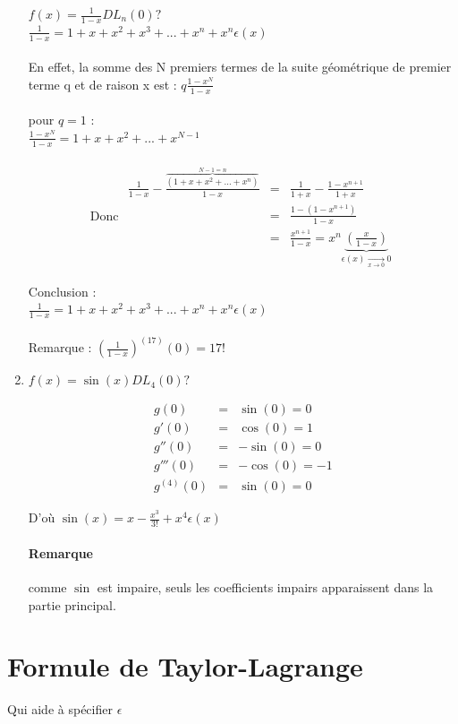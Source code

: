 \begin{enumerate}
	$f(x) = \frac{1}{1-x} DL_n(0) ?$ ~\\
	$\frac{1}{1-x} = 1+x+x^2+x^3 + ... + x^n + x^n\epsilon(x)$ ~\\ ~\\
	En effet, la somme des N premiers termes de la suite géométrique de premier terme q et de raison x est : $q\frac{1-x^N}{1-x}$ ~\\ ~\\
	pour $q=1$ : ~\\
	$\frac{1-x^N}{1-x} = 1+x+x^2+...+x^{N-1}$ ~\\ ~\\
	\[\text{Donc } \begin{array}{rcl}
			\frac{1}{1-x} - \frac{\overbrace{(1+x+x^2 + ...+x^n)}^{N-1=n}}{1-x} &=& \frac{1}{1+x} - \frac{1-x^{n+1}}{1+x} \\
			   &=& \frac{1-(1-x^{n+1})}{1-x} \\
				   &=& \frac{x^{n+1}}{1-x} = x^n \underbrace{(\frac{x}{1-x})}_{\epsilon (x) \xrightarrow[x \to 0]{} 0}
	\end{array}\]

	Conclusion : ~\\
	$\frac{1}{1-x} = 1+x+x^2+x^3 +...+x^n + x^n\epsilon(x)$ ~\\ ~\\
	Remarque : $(\frac{1}{1-x})^{(17)} (0) = 17!$

\item $f(x) = \sin(x) DL_4(0) ?$

	\[\begin{array}{rcl}
			g(0) &=& \sin(0) = 0 \\
			g'(0) &=& \cos(0) = 1 \\
			g''(0) &=& -\sin(0) = 0 \\
			g'''(0) &=& -\cos(0) = -1 \\
			g^{(4)}(0) &=& \sin(0) = 0
	\end{array}\]

	D'où $\sin(x) = x - \frac{x^3}{3!} + x^4 \epsilon (x)$


	\paragraph{Remarque} comme $\sin$ est impaire, seuls les coefficients impairs apparaissent dans la partie principal.
	\end{enumerate}

	\section{Formule de Taylor-Lagrange} Qui aide à spécifier $\epsilon$

